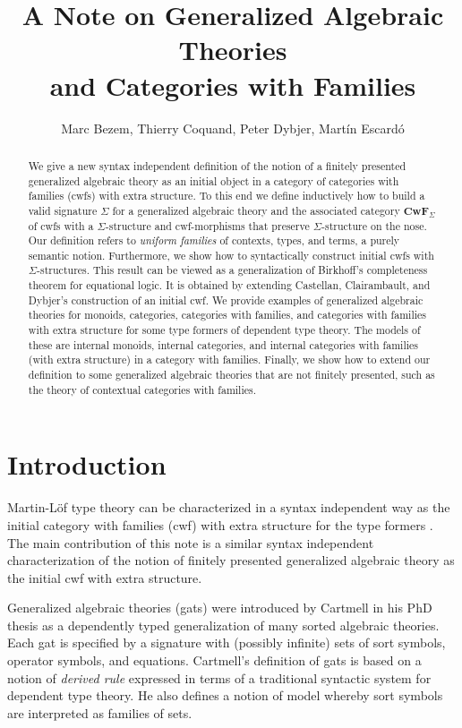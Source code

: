 \documentclass{lmcs}
\title[Generalized Algebraic Theories and Categories with Families]{A Note on Generalized Algebraic Theories\\and Categories with Families}\author{Marc Bezem, Thierry Coquand, Peter Dybjer, Mart\'in Escard\'o}
\def\Cwf{\mathbf{CwF}}
\begin{document}
\maketitle

\begin{abstract}
We give a new syntax independent definition of the notion of a finitely presented generalized algebraic theory as an initial object in a category of categories with families (cwfs) with extra structure. To this end we define inductively how to build a valid signature $\Sigma$ for a generalized algebraic theory and the associated category $\Cwf_\Sigma$ of cwfs with a $\Sigma$-structure and cwf-morphisms that preserve $\Sigma$-structure on the nose.  Our definition refers to {\em uniform families} of contexts, types, and terms, a purely semantic notion. Furthermore, we show how to syntactically construct initial cwfs with $\Sigma$-structures. This result can be viewed as a generalization of Birkhoff's completeness theorem for equational logic. It is obtained by extending Castellan, Clairambault, and Dybjer's construction of an initial cwf. We provide examples of generalized algebraic theories for monoids, categories, categories with families, and categories with families with extra structure for some type formers of dependent type theory. The models of these are internal monoids, internal categories, and internal categories with families (with extra structure) in a category with families. Finally, we show how to extend our definition to some generalized algebraic theories that are not finitely presented, such as the theory of contextual categories with families.
\end{abstract}

\section{Introduction}

Martin-Löf type theory can be characterized in a syntax independent way as the initial category with families (cwf)  with extra structure for the type formers \cite{castellan:tlca2015,castellan:lmcs}. The main contribution of this note is a similar syntax independent characterization of the notion of finitely presented generalized algebraic theory as the initial cwf with extra structure.

Generalized algebraic theories (gats) were introduced by Cartmell in his PhD thesis \cite{cartmell:phd} as a dependently typed generalization of many sorted algebraic theories. Each gat is specified by a signature with (possibly infinite) sets of sort symbols, operator symbols, and equations. Cartmell's definition of gats \cite{cartmell:phd,cartmell:apal} is based on a notion of {\em derived rule} expressed in terms of a traditional syntactic system for dependent type theory. He also defines a notion of model whereby sort symbols are interpreted as families of sets.
\end{document}
